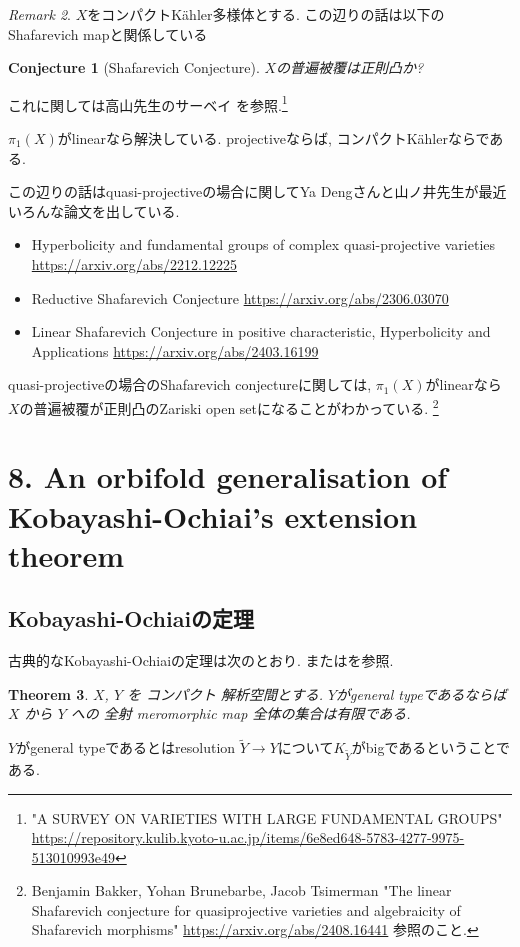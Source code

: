 \documentclass[dvipdfmx,a4paper,11pt]{article} %
\newtheorem{thm}{Theorem}[section]
\newtheorem{conj}[thm]{Conjecture}
\theoremstyle{definition}
\theoremstyle{remark}
\newtheorem{rem}[thm]{Remark}
\numberwithin{equation}{section}
\begin{document}
\begin{rem}
$X$をコンパクトK\"ahler多様体とする. この辺りの話は以下のShafarevich mapと関係している
\begin{conj}[Shafarevich Conjecture]
$X$の普遍被覆は正則凸か?
\end{conj}
これに関しては高山先生のサーベイ を参照.\footnote{"A SURVEY ON VARIETIES WITH LARGE FUNDAMENTAL GROUPS"
\url{https://repository.kulib.kyoto-u.ac.jp/items/6e8ed648-5783-4277-9975-513010993e49}} 

$\pi_1(X)$がlinearなら解決している. projectiveならば\cite{EKPR12}, コンパクトK\"ahlerなら\cite{CCE15}である. 

この辺りの話はquasi-projectiveの場合に関してYa Dengさんと山ノ井先生が最近いろんな論文を出している. 
\begin{itemize}
\item Hyperbolicity and fundamental groups of complex quasi-projective varieties \url{https://arxiv.org/abs/2212.12225}
\item Reductive Shafarevich Conjecture \url{https://arxiv.org/abs/2306.03070}
\item Linear Shafarevich Conjecture in positive characteristic, Hyperbolicity and Applications \url{https://arxiv.org/abs/2403.16199}
\end{itemize}
quasi-projectiveの場合のShafarevich conjectureに関しては, $\pi_1(X)$がlinearなら$X$の普遍被覆が正則凸のZariski open setになることがわかっている. \footnote{ Benjamin Bakker, Yohan Brunebarbe, Jacob Tsimerman "The linear Shafarevich conjecture for quasiprojective varieties and algebraicity of Shafarevich morphisms" \url{https://arxiv.org/abs/2408.16441} 参照のこと. }
\end{rem}



\section{8. An orbifold generalisation of Kobayashi-Ochiai's extension theorem}

\subsection{Kobayashi-Ochiaiの定理}


古典的なKobayashi-Ochiaiの定理は次のとおり. 
\cite{KO75}または\cite[Theorem 7.5.1]{Kob98}を参照. 

\begin{thm}\cite{KO75}
\(X\), \(Y\) を コンパクト 解析空間とする. 
$Y$がgeneral typeであるならば　\(X\) から \(Y\) への 全射 meromorphic map 全体の集合は有限である.
\end{thm}
$Y$がgeneral typeであるとはresolution $\widetilde{Y} \to Y$について$K_{\widetilde{Y}}$がbigであるということである. 
\end{document}
